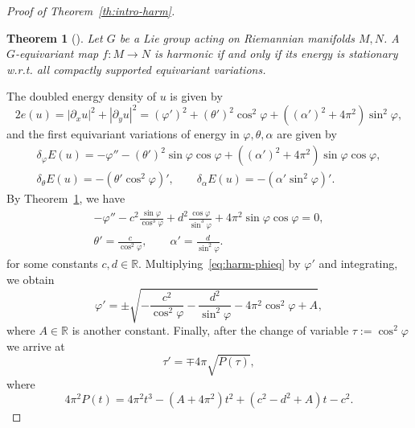 \documentclass{amsart}
\let\phi\varphi
\theoremstyle{plain}
\newtheorem{theorem}{Theorem}
\theoremstyle{definition}
\theoremstyle{remark}
\begin{document}
\begin{proof}[Proof of Theorem~\ref{th:intro-harm}]
\begin{theorem}[{\cite[Theorem~1.3.2]{Smith1972}}]\label{th:harm-red}
Let \(G\) be a Lie group acting on Riemannian manifolds \(M,N\). A
\(G\)-equivariant map \(f\colon M\to N\) is harmonic if and only if its energy
is stationary w.r.t. all compactly supported equivariant variations.
\end{theorem}

The doubled energy density of \(u\) is given by
\begin{equation}\label{eq:harm-eu}
2e(u)=|\partial_x u|^2+|\partial_y u|^2=
(\phi')^2+(\theta')^2\cos^2\phi+((\alpha')^2+4\pi^2)\sin^2\phi,
\end{equation}
and the first equivariant variations of energy in \(\phi,\theta,\alpha\) are
given by
\begin{gather*}
\delta_\phi E(u)=-\phi''-(\theta')^2\sin\phi\cos\phi+
((\alpha')^2+4\pi^2)\sin\phi\cos\phi,\\
\delta_\theta E(u)=-(\theta'\cos^2\phi)',\qquad
\delta_\alpha E(u)=-(\alpha'\sin^2\phi)'.
\end{gather*}
By Theorem~\ref{th:harm-red}, we have
\begin{gather}
-\phi''-c^2\frac{\sin\phi}{\cos^3\phi}+d^2\frac{\cos\phi}{\sin^3\phi}+
4\pi^2\sin\phi\cos\phi=0,\label{eq:harm-phieq}\\
\theta'=\frac{c}{\cos^2\phi},\qquad
\alpha'=\frac{d}{\sin^2\phi}.\label{eq:harm-thaleq}
\end{gather}
for some constants \(c,d\in\mathbb R\). Multiplying~\eqref{eq:harm-phieq} by
\(\phi'\) and integrating, we obtain
\[
\phi'=\pm\sqrt{-\frac{c^2}{\cos^2\phi}-\frac{d^2}{\sin^2\phi}-
4\pi^2\cos^2\phi+A},
\]
where \(A\in\mathbb R\) is another constant. Finally, after the change of
variable \(\tau:=\cos^2\phi\) we arrive at
\begin{equation}\label{eq:harm-taueq}
\tau'=\mp 4\pi\sqrt{P(\tau)},
\end{equation}
where
\begin{equation}\label{eq:harm-P}
4\pi^2 P(t)=4\pi^2 t^3-(A+4\pi^2)t^2+(c^2-d^2+A)t-c^2.
\end{equation}


\end{proof}
\end{document}
